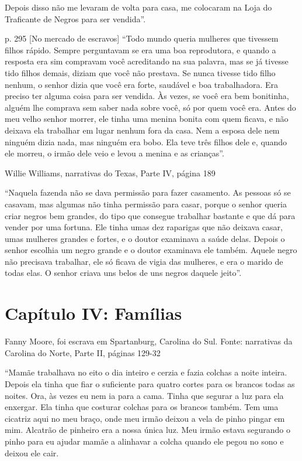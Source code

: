 Depois disso não me levaram de volta para casa, me colocaram na Loja do
Traficante de Negros para ser vendida''.

p. 295 {[}No mercado de escravos{]} ``Todo mundo queria mulheres que
tivessem filhos rápido. Sempre perguntavam se era uma boa reprodutora, e
quando a resposta era sim compravam você acreditando na sua palavra, mas
se já tivesse tido filhos demais, diziam que você não prestava. Se nunca
tivesse tido filho nenhum, o senhor dizia que você era forte, saudável e
boa trabalhadora. Era preciso ter alguma coisa para ser vendida. Às
vezes, se você era bem bonitinha, alguém lhe comprava sem saber nada
sobre você, só por quem você era. Antes do meu velho senhor morrer, ele
tinha uma menina bonita com quem ficava, e não deixava ela trabalhar em
lugar nenhum fora da casa. Nem a esposa dele nem ninguém dizia nada, mas
ninguém era bobo. Ela teve três filhos dele e, quando ele morreu, o
irmão dele veio e levou a menina e as crianças''.

Willie Williams, narrativas do Texas, Parte IV, página 189

``Naquela fazenda
não se dava permissão para fazer casamento. As pessoas só se casavam,
mas algumas não tinha permissão para casar, porque o senhor queria criar
negros bem grandes, do tipo que consegue trabalhar bastante e que dá
para vender por uma fortuna. Ele tinha umas dez raparigas que não
deixava casar, umas mulheres grandes e fortes, e o doutor examinava a
saúde delas. Depois o senhor escolhia um negro grande e o doutor
examinava ele também. Aquele negro não precisava trabalhar, ele só
ficava de vigia das mulheres, e era o marido de todas elas. O senhor
criava uns belos de uns negros daquele jeito''.

\chapter{Capítulo IV: Famílias}

Fanny Moore, foi escrava em Spartanburg, Carolina do Sul. Fonte:
narrativas da Carolina do Norte, Parte II, páginas 129-32

``Mamãe trabalhava no eito o dia inteiro e cerzia e fazia colchas a
noite inteira. Depois ela tinha que fiar o suficiente para quatro cortes
para os brancos todas as noites. Ora, às vezes eu nem ia para a cama.
Tinha que segurar a luz para ela enxergar. Ela tinha que costurar
colchas para os brancos também. Tem uma cicatriz aqui no meu braço, onde
meu irmão deixou a vela de pinho pingar em mim. Alcatrão de pinheiro era
a nossa única luz. Meu irmão estava segurando o pinho para eu ajudar
mamãe a alinhavar a colcha quando ele pegou no sono e deixou ele cair.

